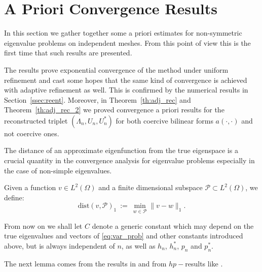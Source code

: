\documentclass[smallextended]{svjour3}
\begin{document}
\section{A Priori Convergence Results}\label{sse:pcf_priori}\label{sec:aprio}



In this section  we gather together some a priori estimates for non-symmetric eigenvalue
problems on independent meshes. From this point of view this is the first time that such results are presented. 

The results prove exponential convergence of the method under uniform refinement and cast some hopes that the same kind of convergence is achieved with adaptive refinement as well. This is confirmed by the numerical results in Section~\ref{ssec:reent}. 
Moreover, in Theorem~\ref{th:adj_rec} and Theorem~\ref{th:adj_rec_2} we proved convergence a priori results for the reconstructed triplet $(\Lambda_n,U_n,U_n^*)$ for both coercive bilinear forms $a(\cdot,\cdot)$ and not coercive ones.



The distance of an approximate eigenfunction from the true eigenspace
is a crucial quantity in the convergence analysis for
eigenvalue problems  especially in the case of non-simple
eigenvalues.

\begin{definition}
\label{def:dist_h1}
Given a function $v\in L^2(\Omega)$ and a finite dimensional subspace $\mathcal{P}\subset L^2(\Omega)$, we define:
$$
\mathrm{dist}(v,\mathcal{P})_{1}\ :=\ \min_{ w\in\mathcal{P}}  \|v-w\|_{1} .
$$

\end{definition}


From now on we shall let $C$ denote  a generic constant which 
may depend
on the 
true eigenvalues and vectors of \eqref{eq:var_prob} and other
constants introduced above, but is always independent of
$n$, as well as $h_n$, $h^*_n$, $p_n$ and $p^*_n$.  

The next lemma comes from the results in \cite{babuska}
and from $hp-$results like \cite[Theorem~4.72]{schwab}.
\end{document}
